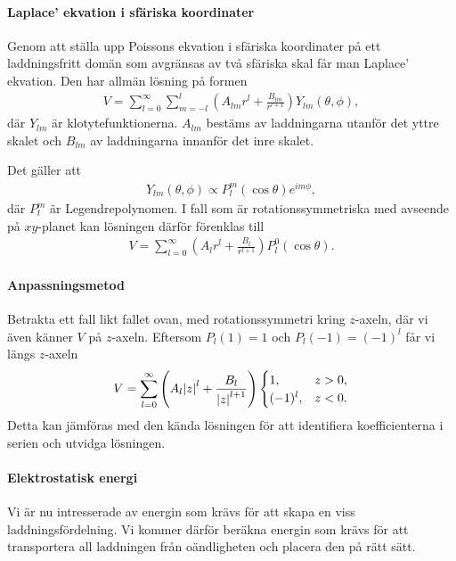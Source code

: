 \paragraph{Laplace' ekvation i sfäriska koordinater}
Genom att ställa upp Poissons ekvation i sfäriska koordinater på ett laddningsfritt domän som avgränsas av två sfäriska skal får man Laplace' ekvation. Den har allmän lösning på formen
\begin{align*}
	V = \sum\limits_{l = 0}^{\infty}\sum\limits_{m = -l}^{l}\left(A_{lm}r^{l} + \frac{B_{lm}}{r^{l + 1}}\right)Y_{lm}(\theta, \phi),
\end{align*}
där $Y_{lm}$ är klotytefunktionerna. $A_{lm}$ bestäms av laddningarna utanför det yttre skalet och $B_{lm}$ av laddningarna innanför det inre skalet.

Det gäller att
\begin{align*}
	Y_{lm}(\theta, \phi)\propto P_{l}^{m}(\cos{\theta})e^{im\phi},
\end{align*}
där $P_{l}^{m}$ är Legendrepolynomen. I fall som är rotationssymmetriska med avseende på $xy$-planet kan lösningen därför förenklas till
\begin{align*}
	V = \sum\limits_{l = 0}^{\infty}\left(A_{l}r^{l} + \frac{B_{l}}{r^{l + 1}}\right)P_{l}^{0}(\cos{\theta}).
\end{align*}

\paragraph{Anpassningsmetod}
Betrakta ett fall likt fallet ovan, med rotationssymmetri kring $z$-axeln, där vi även känner $V$ på $z$-axeln. Eftersom $P_{l}(1) = 1$ och $P_{l}(-1) = (-1)^{l}$ får vi längs $z$-axeln
\begin{align*}
	V = \sum\limits_{l = 0}^{\infty}\left(A_{l}\abs{z}^{l} + \frac{B_{l}}{\abs{z}^{l + 1}}\right)
	\begin{cases}
		1,        &z > 0, \\
		(-1)^{l}, &z < 0.
	\end{cases}
\end{align*}
Detta kan jämföras med den kända lösningen för att identifiera koefficienterna i serien och utvidga lösningen.

\paragraph{Elektrostatisk energi}
Vi är nu intresserade av energin som krävs för att skapa en viss laddningsfördelning. Vi kommer därför beräkna energin som krävs för att transportera all laddningen från oändligheten och placera den på rätt sätt.

